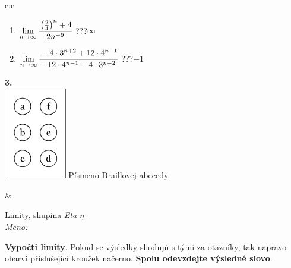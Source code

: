 \documentclass[10pt]{report}
\begin{document}
\begin{tabular}{c:c}
\begin{minipage}[c][104.5mm][t]{0.5\linewidth}
\begin{center}
\begin{minipage}{0.79\linewidth}
\begin{center}
\begin{varwidth}{\linewidth}
\begin{enumerate}
\item $\lim\limits_{n\to\infty}\cfrac{\left(\frac{2}{4}\right)^n +4}{2n^{-9}}$\quad \dotfill\; ???\;\dotfill \quad $\infty$
\item $\lim\limits_{n\to\infty}\cfrac{-4\cdot 3^{n+2}+12\cdot 4^{n-1}}{-12\cdot 4^{n-1}-4\cdot 3^{n-2}}$\quad \dotfill\; ???\;\dotfill \quad $-1$
\end{enumerate}
\end{varwidth}
\end{center}
\end{minipage}
\begin{minipage}{0.20\linewidth}
\begin{center}
{\Huge\bfseries 3.} \\[2mm]
\includegraphics[height=40mm]{../images/braille.png}
{\small Písmeno Braillovej abecedy}
\end{center}
\end{minipage}
\end{center}
\end{minipage}
&
\begin{minipage}[c][104.5mm][t]{0.5\linewidth}
\begin{center}
\vspace{7mm}
{\huge Limity, skupina \textit{Eta $\eta$} -}\\[5mm]
\textit{Meno:}\phantom{xxxxxxxxxxxxxxxxxxxxxxxxxxxxxxxxxxxxxxxxxxxxxxxxxxxxxxxxxxxxxxxxx}\\[5mm]
\begin{minipage}{0.95\linewidth}
\begin{center}
\textbf{Vypočti limity}. Pokud se výsledky shodujú s tými za otazníky, tak napravo\\obarvi příslušející kroužek načerno. \textbf{Spolu odevzdejte výsledné slovo}.
\end{center}
\end{minipage}
\\[1mm]
\begin{minipage}{0.79\linewidth}
\begin{center}
\begin{varwidth}{\linewidth}

\end{varwidth}
\end{center}
\end{minipage}
\end{center}
\end{minipage}
\end{tabular}
\end{document}
